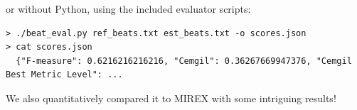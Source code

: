 \documentclass[paperwidth=120cm,paperheight=90cm,portrait,fontscale=.22,margin=5cm,lmargin=.2cm,rmargin=.2cm]{baposter}
\begin{document}
\begin{poster}
\begin{posterbox}[below=auto]{}
\Huge
or without Python, using the included evaluator scripts:
\end{posterbox}

\begin{posterbox}[name=evaluator,below=auto]{}

\begin{verbatim}
> ./beat_eval.py ref_beats.txt est_beats.txt -o scores.json
> cat scores.json
  {"F-measure": 0.6216216216216, "Cemgil": 0.36267669947376, "Cemgil Best Metric Level": ...
\end{verbatim}

\end{posterbox}

\begin{posterbox}[below=auto]{}
\Huge
We also quantitatively compared it to MIREX with some intriguing results!
\end{posterbox}

\end{poster}
\end{document}
